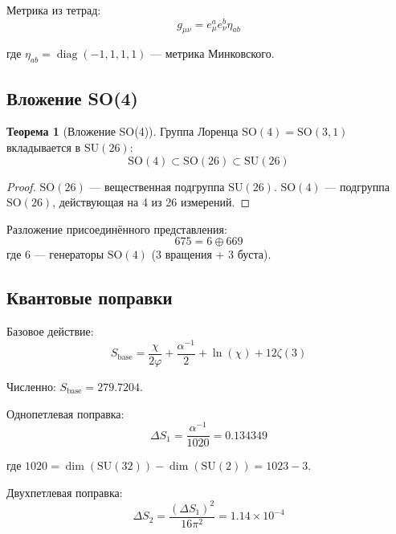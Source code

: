 \documentclass[12pt,a4paper,twoside]{article}
\newcommand{\SU}{\mathrm{SU}}
\newcommand{\SO}{\mathrm{SO}}
\newcommand{\diag}{\operatorname{diag}}
\theoremstyle{definition}
\newtheorem{theorem}{Теорема}[section]
\begin{document}
Метрика из тетрад:
\begin{equation}
g_{\mu\nu} = e_\mu^a e_\nu^b \eta_{ab}
\label{eq:metric}
\end{equation}

где $\eta_{ab} = \diag(-1, 1, 1, 1)$ — метрика Минковского.

\subsection{Вложение SO(4)}

\begin{theorem}[Вложение SO(4)]
Группа Лоренца $\SO(4) = \SO(3,1)$ вкладывается в $\SU(26)$:
\begin{equation}
\SO(4) \subset \SO(26) \subset \SU(26)
\end{equation}
\end{theorem}

\begin{proof}
$\SO(26)$ — вещественная подгруппа $\SU(26)$. $\SO(4)$ — подгруппа $\SO(26)$, действующая на 4 из 26 измерений.
\end{proof}

Разложение присоединённого представления:
\begin{equation}
675 = 6 \oplus 669
\end{equation}
где 6 — генераторы $\SO(4)$ (3 вращения + 3 буста).

\subsection{Квантовые поправки}

Базовое действие:
\begin{equation}
S_{\text{base}} = \frac{\chi}{2\varphi} + \frac{\alpha^{-1}}{2} + \ln(\chi) + 12\zeta(3)
\label{eq:s_base}
\end{equation}

Численно: $S_{\text{base}} = 279.7204$.

Однопетлевая поправка:
\begin{equation}
\Delta S_1 = \frac{\alpha^{-1}}{1020} = 0.134349
\label{eq:ds1}
\end{equation}

где $1020 = \dim(\SU(32)) - \dim(\SU(2)) = 1023 - 3$.

Двухпетлевая поправка:
\begin{equation}
\Delta S_2 = \frac{(\Delta S_1)^2}{16\pi^2} = 1.14 \times 10^{-4}
\label{eq:ds2}
\end{equation}
\end{document}
